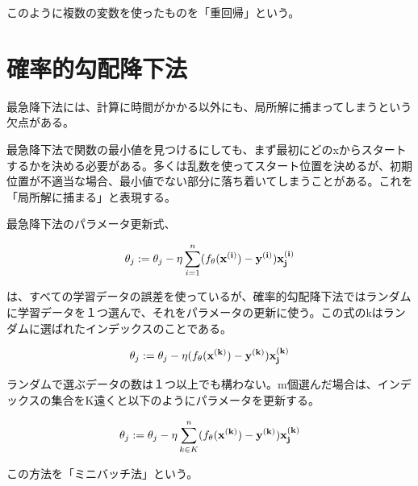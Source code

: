 \documentclass{jsarticle}
\begin{document}
このように複数の変数を使ったものを「重回帰」という。

\section{確率的勾配降下法}
最急降下法には、計算に時間がかかる以外にも、局所解に捕まってしまうという欠点がある。

最急降下法で関数の最小値を見つけるにしても、まず最初にどのxからスタートするかを決める必要がある。多くは乱数を使ってスタート位置を決めるが、初期位置が不適当な場合、最小値でない部分に落ち着いてしまうことがある。これを「局所解に捕まる」と表現する。

最急降下法のパラメータ更新式、

\begin{align}
	\theta_j := \theta_j - \eta \sum_{i=1}^{n} (f_{\theta}(\bf{x}^{(i)}) - y^{(i)})x_{j}^{(i)}
\end{align}

は、すべての学習データの誤差を使っているが、確率的勾配降下法ではランダムに学習データを１つ選んで、それをパラメータの更新に使う。この式のkはランダムに選ばれたインデックスのことである。

\begin{align}
	\theta_j := \theta_j - \eta (f_{\theta}(\bf{x}^{(k)}) - y^{(k)})x_{j}^{(k)}
\end{align}

ランダムで選ぶデータの数は１つ以上でも構わない。m個選んだ場合は、インデックスの集合をK遠くと以下のようにパラメータを更新する。

\begin{align}
	\theta_j := \theta_j - \eta \sum_{k \in K}^{n} (f_{\theta}(\bf{x}^{(k)}) - y^{(k)})x_{j}^{(k)}
\end{align}

この方法を「ミニバッチ法」という。
\end{document}
